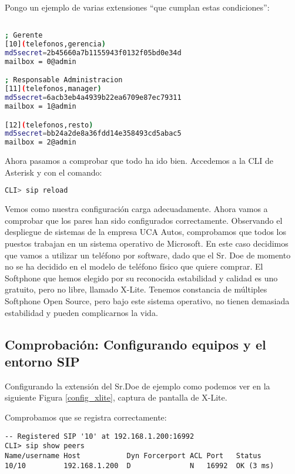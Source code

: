 Pongo un ejemplo de varias extensiones ``que cumplan estas condiciones'':

\begin{lstlisting}[language=bash,title={/etc/asterisk/sip.conf}]

; Gerente
[10](telefonos,gerencia)
md5secret=2b45660a7b1155943f0132f05bd0e34d
mailbox = 0@admin

; Responsable Administracion
[11](telefonos,manager)
md5secret=6acb3eb4a4939b22ea6709e87ec79311
mailbox = 1@admin

[12](telefonos,resto)
md5secret=bb24a2de8a36fdd14e358493cd5abac5
mailbox = 2@admin

\end{lstlisting}

Ahora pasamos a comprobar que todo ha ido bien. Accedemos a la CLI de Asterisk y con el comando:

\begin{lstlisting}[language=sh]
CLI> sip reload
\end{lstlisting}

Vemos como nuestra configuración carga adecuadamente. Ahora vamos a comprobar que los pares han sido configurados correctamente. Observando el despliegue de sistemas de la empresa UCA Autos, comprobamos que todos los puestos trabajan en un sistema operativo de Microsoft. En este caso decidimos que vamos a utilizar un teléfono por software, dado que el Sr. Doe de momento no se ha decidido en el modelo de teléfono físico que quiere comprar. El Softphone que hemos elegido por su reconocida estabilidad y calidad es uno gratuito, pero no libre, llamado X-Lite. Tenemos constancia de múltiples Softphone Open Source, pero bajo este sistema operativo, no tienen demasiada estabilidad y pueden complicarnos la vida.

\subsection{Comprobación: Configurando equipos y el entorno SIP}

Configurando la extensión del Sr.Doe de ejemplo como podemos ver en la siguiente Figura \ref{config_xlite}, captura de pantalla de X-Lite.


Comprobamos que se registra correctamente:

\begin{lstlisting}[style=consola]
-- Registered SIP '10' at 192.168.1.200:16992
CLI> sip show peers
Name/username Host           Dyn Forcerport ACL Port   Status
10/10         192.168.1.200  D              N   16992  OK (3 ms)
\end{lstlisting}


